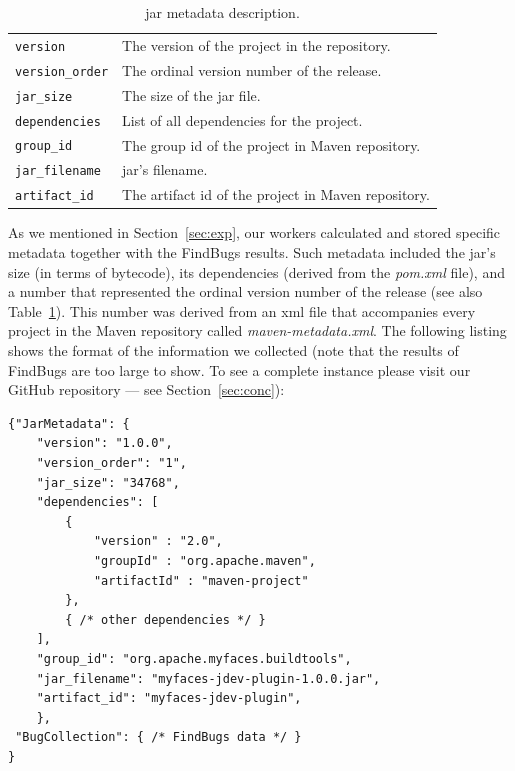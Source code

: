 \documentclass{sig-alternate}
\begin{document}
\begin{table}[b]
\centering
\begin{tabular}{l p{5.0cm}}
 \hline
\verb|version| & The version of the project in the repository. \\
\verb|version_order| & The ordinal version number of the release. \\
\verb|jar_size| & The size of the {\sc jar} file. \\
\verb|dependencies| & List of all dependencies for the project. \\
\verb|group_id| & The group {\sc id} of the project in Maven repository. \\
\verb|jar_filename| & {\sc jar}'s filename. \\
\verb|artifact_id| & The artifact {\sc id} of the project in Maven repository. \\
 \hline
 \end{tabular}
\caption{{\sc jar} metadata description.}
\label{tbl:metadata-description}
\end{table}

As we mentioned in Section~\ref{sec:exp}, our
workers calculated and stored specific metadata together
with the FindBugs results.
Such metadata included the {\sc jar}'s size (in terms of bytecode),
its dependencies
(derived from the {\it pom.xml} file),
and a number that represented the ordinal version
number of the release (see also
Table~\ref{tbl:metadata-description}).
This number was derived from an {\sc xml}
file that accompanies every project in the Maven repository
called {\it maven-metadata.xml}.
The following listing shows the format of the
information we collected (note
that the results of FindBugs are too large to
show. To see a complete instance please visit our
GitHub repository --- see Section~\ref{sec:conc}):
 
\begin{small}
\begin{verbatim}
{"JarMetadata": {
    "version": "1.0.0",
    "version_order": "1",
    "jar_size": "34768",
    "dependencies": [
        {
            "version" : "2.0",
            "groupId" : "org.apache.maven",
            "artifactId" : "maven-project"
        },
        { /* other dependencies */ }
    ],
    "group_id": "org.apache.myfaces.buildtools",
    "jar_filename": "myfaces-jdev-plugin-1.0.0.jar",
    "artifact_id": "myfaces-jdev-plugin",
    }, 
 "BugCollection": { /* FindBugs data */ }
}
\end{verbatim}
\end{small}
\end{document}
